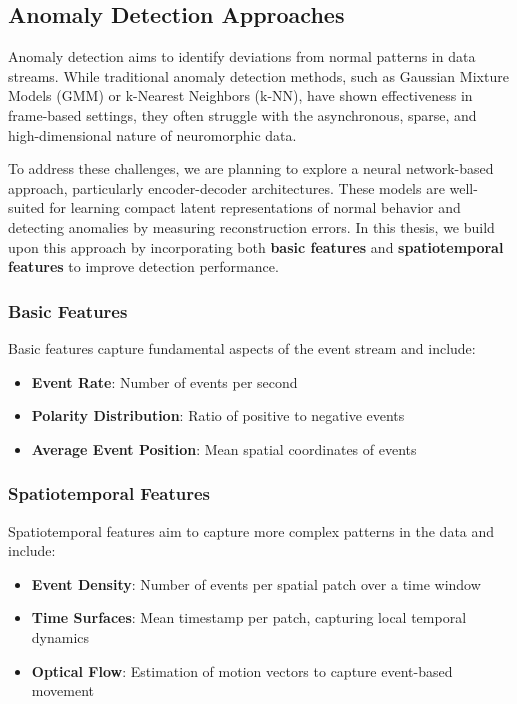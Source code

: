 \documentclass[12pt,a4paper]{article}
\begin{document}
\subsection{Anomaly Detection Approaches}

Anomaly detection aims to identify deviations from normal patterns in data streams. While traditional anomaly detection methods, such as Gaussian Mixture Models (GMM) or k-Nearest Neighbors (k-NN), have shown effectiveness in frame-based settings, they often struggle with the asynchronous, sparse, and high-dimensional nature of neuromorphic data.

To address these challenges, we are planning to explore a neural network-based approach, particularly encoder-decoder architectures. These models are well-suited for learning compact latent representations of normal behavior and detecting anomalies by measuring reconstruction errors. In this thesis, we build upon this approach by incorporating both \textbf{basic features} and \textbf{spatiotemporal features} to improve detection performance.

\subsubsection{Basic Features}

Basic features capture fundamental aspects of the event stream and include:

\begin{itemize}
    \item \textbf{Event Rate}: Number of events per second
    \item \textbf{Polarity Distribution}: Ratio of positive to negative events
    \item \textbf{Average Event Position}: Mean spatial coordinates of events
\end{itemize}

\subsubsection{Spatiotemporal Features}

Spatiotemporal features aim to capture more complex patterns in the data and include:

\begin{itemize}
    \item \textbf{Event Density}: Number of events per spatial patch over a time window
    \item \textbf{Time Surfaces}: Mean timestamp per patch, capturing local temporal dynamics
    \item \textbf{Optical Flow}: Estimation of motion vectors to capture event-based movement
\end{itemize}
\end{document}
